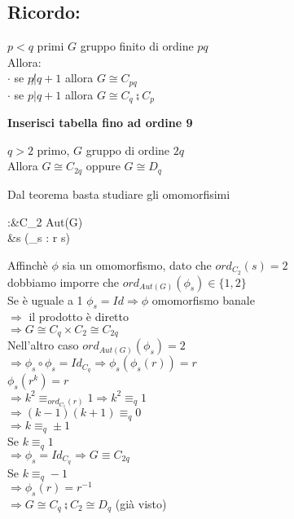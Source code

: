 \documentclass[12px]{article}
\begin{document}
{	\subsection{Ricordo:}
	\begin{teo}
		$p < q$ primi $G$ gruppo finito di ordine $pq$\\
		Allora:\\
		$\cdot$ se $p\not  | q + 1$ allora $G\cong C_{pq}$\\
		 $\cdot$ se $p | q + 1$ allora $ G\cong C_q\semi C_p$
	\end{teo}
	\textbf{Inserisci tabella fino ad ordine 9}
	\begin{coro}
		$q > 2$ primo, $G$ gruppo di ordine $2q$\\
		Allora $G\cong C_{2q}$ oppure $G\cong D_q$
	\end{coro}
	\begin{dimo}
		Dal teorema basta studiare gli omomorfisimi
		\begin{center}
		\begin{aligned}
			\phi:&C_2 \rightarrow Aut(G)\\
			     &s \rightarrow (\phi_s : r \rightarrow s)
			
		\end{aligned}
		\end{center}
		Affinchè $\phi$ sia un omomorfismo, dato che $ord_{C_2}(s) = 2$\\
		dobbiamo imporre che $ord_{Aut(G)}(\phi_s) \in \{1,2\}$\\
		Se è uguale a 1 $\phi_s = Id \Rightarrow \phi$ omomorfismo banale\\
		$ \Rightarrow $ il prodotto è diretto\\
		$ \Rightarrow G\cong C_q\times C_2\cong C_{2q}$ \\
		Nell'altro caso $ord_{Aut(G)}(\phi_s) = 2$\\
		$ \Rightarrow \phi_s\circ\phi_s = Id_{C_q} \Rightarrow \phi_s(\phi_s(r))=r$ \\
		$\phi_s(r^k) = r$\\
		$ \Rightarrow k^2\equiv_{ord_{C_1}(r)} 1 \Rightarrow k^2\equiv_q 1$ \\
		$ \Rightarrow (k-1)(k+1)\equiv_q 0$ \\
		$ \Rightarrow k\equiv_q \pm 1$ \\
		Se $k \equiv_q 1$\\
		$ \Rightarrow \phi_s = Id_{C_q} \Rightarrow G\equiv C_{2q}$ \\
		Se $k\equiv_q -1$\\
		$ \Rightarrow \phi_s(r) = r^{-1}$\\
		$ \Rightarrow G\cong C_q\semi C_2\cong D_q$ (già visto)


\end{dimo}}
\end{document}
